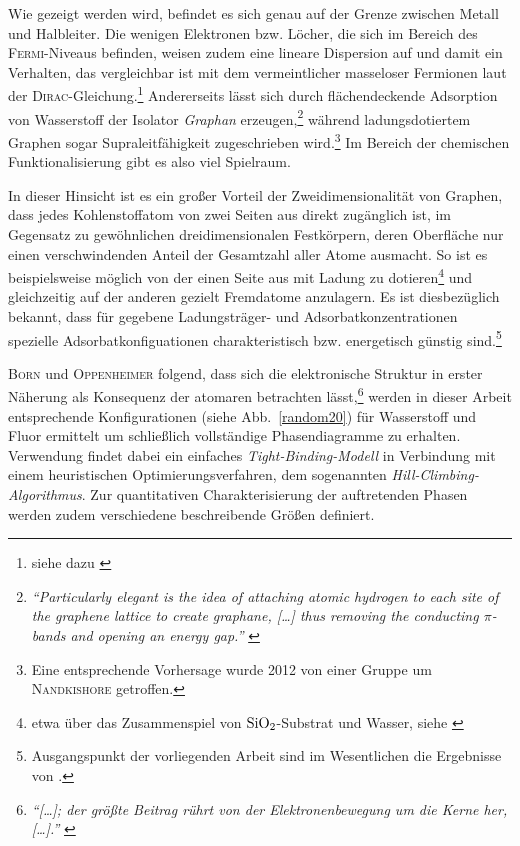 \documentclass[a4paper, 10pt, twoside, openany]{book} %
\begin{document}
Wie gezeigt werden wird, befindet es sich genau auf der Grenze zwischen Metall und Halbleiter. Die wenigen Elektronen bzw. Löcher, die sich im Bereich des \textsc{Fermi}-Niveaus befinden, weisen zudem eine lineare Dispersion auf und damit ein Verhalten, das vergleichbar ist mit dem vermeintlicher masseloser Fermionen laut der \textsc{Dirac}-Gleichung.\footnote{siehe dazu \cite[Abschnitt III]{Katsnelson2}} Andererseits lässt sich durch flächendeckende Adsorption von Wasserstoff der Isolator \emph{Graphan} erzeugen,\footnote{\emph{"`Particularly elegant is the idea of attaching atomic hydrogen to each site of the graphene lattice to create graphane, \emph{[\dots]} thus removing the conducting $\pi$-bands and opening an energy gap."'} \cite[S.~610]{Elias}} während ladungsdotiertem Graphen sogar Supraleitfähigkeit zugeschrieben wird.\footnote{Eine entsprechende Vorhersage wurde 2012 von einer Gruppe um \textsc{Nandkishore} \cite{Nandkishore} getroffen.} Im Bereich der chemischen Funktionalisierung gibt es also viel Spielraum.

In dieser Hinsicht ist es ein großer Vorteil der Zweidimensionalität von Graphen, dass jedes Kohlenstoffatom von zwei Seiten aus direkt zugänglich ist, im Gegensatz zu gewöhnlichen dreidimensionalen Festkörpern, deren Oberfläche nur einen verschwindenden Anteil der Gesamtzahl aller Atome ausmacht. So ist es beispielsweise möglich von der einen Seite aus mit Ladung zu dotieren\footnote{etwa über das Zusammenspiel von $\rm SiO_2$-Substrat und Wasser, siehe \cite{Wehling1}} und gleichzeitig auf der anderen gezielt Fremdatome anzulagern. Es ist diesbezüglich bekannt, dass für gegebene Ladungsträger- und Adsorbatkonzentrationen spezielle Adsorbatkonfiguationen charakteristisch bzw. energetisch günstig sind.\footnote{Ausgangspunkt der vorliegenden Arbeit sind im Wesentlichen die Ergebnisse von \cite{Wehling2}.}

\textsc{Born} und \textsc{Oppenheimer} folgend, dass sich die elektronische Struktur in erster Näherung als Konsequenz der atomaren betrachten lässt,\footnote{\emph{"`\emph{[\dots]}; der größte Beitrag rührt von der Elektronenbewegung um die Kerne her, \emph{[\dots]}."'} \cite[S.~457]{Born}} werden in dieser Arbeit entsprechende Konfigurationen (siehe Abb.~\ref{random20}) für Wasserstoff und Fluor ermittelt um schließlich vollständige Phasendiagramme zu erhalten. Verwendung findet dabei ein einfaches \emph{Tight-Binding-Modell} in Verbindung mit einem heuristischen Optimierungsverfahren, dem sogenannten \emph{Hill-Climbing-Algorithmus}. Zur quantitativen Charakterisierung der auftretenden Phasen werden zudem verschiedene beschreibende Größen definiert.
\end{document}

